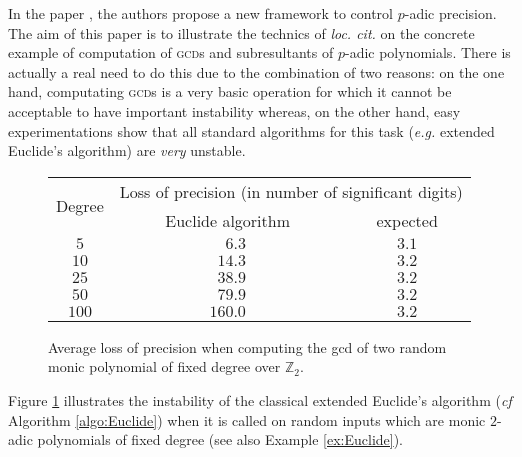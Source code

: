 \documentclass{jT}
\numberwithin{equation}{section}
\theoremstyle{definition}
\newcommand{\Z}{\mathbb Z}
\begin{document}
In the paper \cite{padicprec}, the authors propose a new framework to 
control $p$-adic precision. The aim of this paper is to illustrate the 
technics of \emph{loc. cit.} on the concrete example of computation of 
\textsc{gcd}s and subresultants of $p$-adic polynomials. There is 
actually a real need to do this due to the combination of two reasons: 
on the one hand, computating \textsc{gcd}s is a very basic operation for 
which it cannot be acceptable to have important instability whereas, on 
the other hand, easy experimentations show that all standard algorithms 
for this task (\emph{e.g.} extended Euclide's algorithm) are \emph{very} 
unstable.
%
\begin{figure}
\renewcommand{\arraystretch}{1.2}
\begin{center}
\begin{tabular}{|c||c|c|}
\hline
\multirow{2}{*}{\hspace{0.2cm}Degree\hspace{0.2cm}\null} & 
\multicolumn{2}{c|}{\hspace{0.1cm}Loss of precision (in number of significant digits)\hspace{0.1cm}\null}\\
\cline{2-3}
& \hspace{0.5cm}Euclide algorithm\hspace{0.5cm}\null & expected \\
\hline
$5$ & $\phantom{00}6.3$ & $3.1$ \\
$10$ & $\phantom{0}14.3$ & $3.2$ \\
$25$ & $\phantom{0}38.9$ & $3.2$ \\
$50$ & $\phantom{0}79.9$ & $3.2$ \\
$100$ & $160.0$ & $3.2$ \\
\hline
\end{tabular}
\end{center}

\vspace{-0.3cm}

\caption{Average loss of precision when computing the {\sc gcd}
of two random monic polynomial of fixed degree over $\Z_2$.}
\label{fig:precision}

\vspace{-0.3cm}
\end{figure}
%
Figure \ref{fig:precision} illustrates the instability of the classical
extended Euclide's algorithm (\emph{cf} Algorithm \ref{algo:Euclide})
when it is called on random inputs which are monic $2$-adic 
polynomials of fixed degree (see also Example \ref{ex:Euclide}). 
\end{document}
